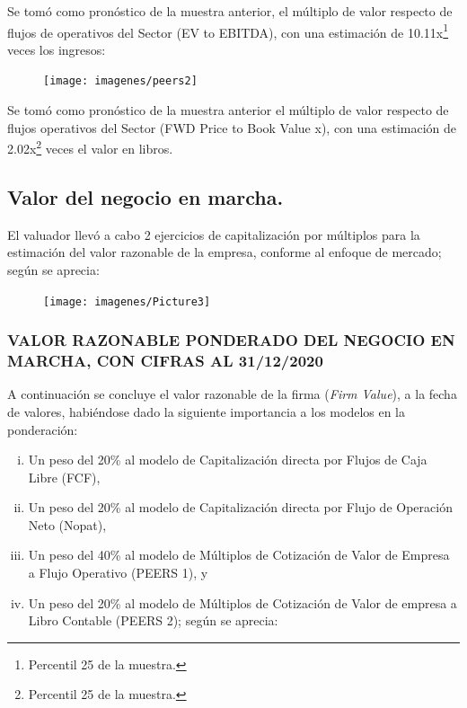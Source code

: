 Se tom\'o como pron\'ostico de la muestra anterior, el m\'ultiplo de valor respecto de flujos de operativos del Sector (EV to EBITDA), con una estimaci\'on de 10.11x\footnote{Percentil 25 de la muestra.}  veces los ingresos:

\begin{figure}[H]
\centering
\texttt{[image: imagenes/peers2]}
\end{figure}



Se tom\'o como pron\'ostico de la muestra anterior el m\'ultiplo de valor respecto de flujos operativos del Sector (FWD Price to Book Value x), con una estimaci\'on de \textcolor{principal}{2.02x}\footnote{Percentil 25 de la muestra.} veces el valor en libros.\\

\espacio{2cm}

\subsection{Valor del negocio en marcha.} El valuador llev\'o a cabo 2 ejercicios de capitalizaci\'on por m\'ultiplos para la estimaci\'on del valor razonable de la empresa, conforme al enfoque de mercado; seg\'un se aprecia:

\begin{figure}[H]
\centering
\texttt{[image: imagenes/Picture3]}
\end{figure}

\subsubsection{VALOR RAZONABLE PONDERADO DEL NEGOCIO EN MARCHA, CON CIFRAS AL 31/12/2020}

A continuaci\'on se concluye el valor razonable de la firma (\textit{Firm Value}), a la fecha de valores, habi\'endose dado la siguiente importancia a los modelos en la ponderaci\'on: 
\begin{enumerate}[i)]

\item Un peso del 20\% al modelo de Capitalizaci\'on directa por Flujos de Caja Libre (FCF), \item  Un peso del 20\% al modelo de Capitalizaci\'on directa por Flujo de Operaci\'on Neto (Nopat), 
\item  Un peso del 40\% al modelo de M\'ultiplos de Cotizaci\'on de Valor de Empresa a Flujo Operativo (PEERS 1), y 
\item Un peso del 20\% al modelo de M\'ultiplos de Cotizaci\'on de Valor de empresa a Libro Contable (PEERS 2); seg\'un se aprecia:
\end{enumerate}

